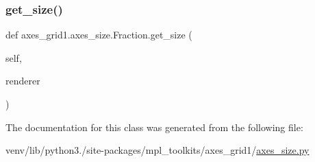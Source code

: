 \subsubsection{\texorpdfstring{get\+\_\+size()}{get\_size()}}
{\footnotesize\ttfamily def axes\+\_\+grid1.\+axes\+\_\+size.\+Fraction.\+get\+\_\+size (\begin{DoxyParamCaption}\item[{}]{self,  }\item[{}]{renderer }\end{DoxyParamCaption})}



The documentation for this class was generated from the following file\+:\begin{DoxyCompactItemize}
\item 
venv/lib/python3./site-\/packages/mpl\+\_\+toolkits/axes\+\_\+grid1/\hyperlink{_2axes__size_8py}{axes\+\_\+size.\+py}\end{DoxyCompactItemize}
